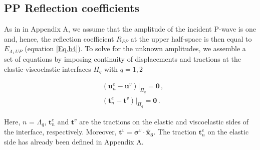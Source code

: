 \documentclass[draft]{agujournal2019}
\begin{document}
\subsection{PP Reflection coefficients}
As in in Appendix A, we assume that the amplitude of the incident P-wave is one and, hence, the reflection coefficient $R_{PP}$ at the upper half-space is then equal to $E_{\Lambda_1\, UP}$ (equation \eqref{Eq.b4}). To solve for the unknown amplitudes, we assemble a set of equations by imposing continuity of displacements and tractions at the elastic-viscoelastic interfaces $\Pi_q$ with $q=1,2$
\begin{linenomath*}
\begin{equation}\label{Eq.b10}
\begin{split}
&  \left. \left(  \bm{u}_n^e -  \bm{u}^v \right) \right \rvert_{\Pi_q} = \bm{0} \,, \\
&  \left. \left( \bm{t}_n^e  - \bm{t}^v  \right) \right \rvert_{\Pi_q} = \bm{0} \,.
\end{split}
\end{equation}
\end{linenomath*}
Here, $n$ = $\Lambda_q$, $\bm{t}_n^e$ and $\bm{t}^v$ are the tractions on the elastic and viscoelastic sides of the interface, respectively. Moreover, $\bm{t}^v =\bm{\sigma}^v \cdot \bm{\hat {x}_3} $. The traction $\bm{t}_n^e$ on the elastic side has already been defined in Appendix A.


\end{document}
